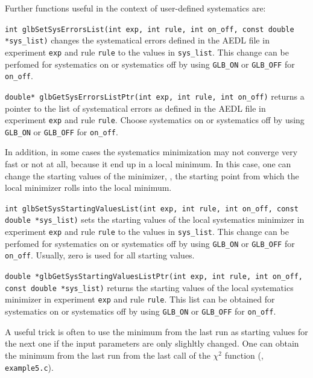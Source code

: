 Further functions useful in the context of user-defined systematics are:
\begin{function}
{\tt int glbSetSysErrorsList(int exp, int rule, int on\_off, const double *sys\_list)}
changes the systematical errors defined in the AEDL file in experiment {\tt exp} and 
rule {\tt rule} to the values in {\tt sys\_list}. This change can be perfomed for
systematics on or systematics off by using {\tt GLB\_ON} or {\tt GLB\_OFF} for {\tt on\_off}. 
\end{function}
\begin{function}
{\tt double* glbGetSysErrorsListPtr(int exp, int rule, int on\_off)}
returns a pointer to the list of systematical errors as defined in the AEDL file in experiment {\tt exp} and 
rule {\tt rule}. Choose
systematics on or systematics off by using {\tt GLB\_ON} or {\tt GLB\_OFF} for {\tt on\_off}. 
\end{function}
In addition, in some cases the systematics minimization may not converge very fast or not at all, because it end up in a local minimum. In this case, one can change the starting values of the minimizer, \ie, the
starting point from which the local minimizer rolls into the local minimum.
\begin{function}
{\tt int glbSetSysStartingValuesList(int exp, int rule, int on\_off, const double *sys\_list)}
sets the starting values of the local systematics minimizer in experiment {\tt exp} and 
rule {\tt rule} to the values in {\tt sys\_list}. This change can be perfomed for
systematics on or systematics off by using {\tt GLB\_ON} or {\tt GLB\_OFF} for {\tt on\_off}. 
Usually, zero is used for all starting values. 
\end{function}
\begin{function}
{\tt double *glbGetSysStartingValuesListPtr(int exp, int rule, int on\_off, const double *sys\_list)}
returns the starting values of the local systematics minimizer in experiment {\tt exp} and 
rule {\tt rule}. This list can be obtained for
systematics on or systematics off by using {\tt GLB\_ON} or {\tt GLB\_OFF} for {\tt on\_off}.
\end{function}
A useful trick is often to use the minimum from the last run as starting values for the next one
if the input parameters are only slighltly changed. One can obtain the minimum from the last run 
from the last call of the $\chi^2$ function (\cf, {\tt example5.c}).


